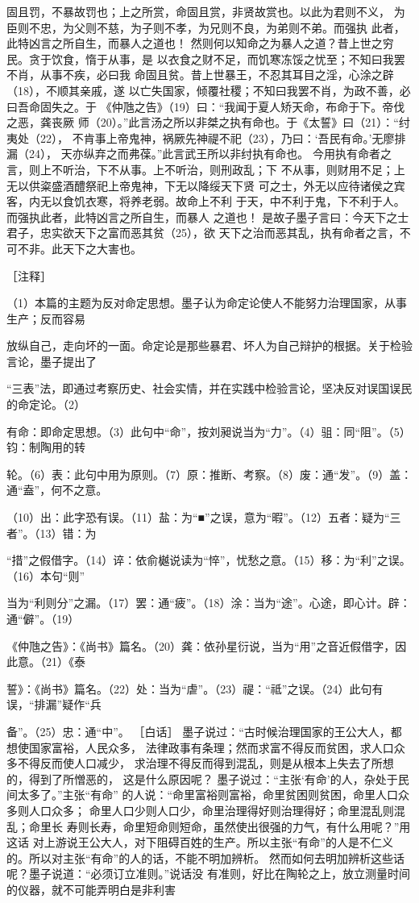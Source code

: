 \documentclass[12pt,UTF8]{ctexbook}
\begin{document}
固且罚，不暴故罚也；上之所赏，命固且赏，非贤故赏也。以此为君则不义， 
为臣则不忠，为父则不慈，为子则不孝，为兄则不良，为弟则不弟。而强执 
此者，此特凶言之所自生，而暴人之道也！ 
然则何以知命之为暴人之道？昔上世之穷民。贪于饮食，惰于从事，是 
以衣食之财不足，而饥寒冻馁之忧至；不知曰我罢不肖，从事不疾，必曰我 
命固且贫。昔上世暴王，不忍其耳目之淫，心涂之辟（18），不顺其亲戚，遂 
以亡失国家，倾覆社稷；不知曰我罢不肖，为政不善，必曰吾命固失之。于 
《仲虺之告》（19）曰：“我闻于夏人矫天命，布命于下。帝伐之恶，龚丧厥 
师（20）。”此言汤之所以非桀之执有命也。于《太誓》曰（21）：“纣夷处（22）， 
不肯事上帝鬼神，祸厥先神禔不祀（23），乃曰：‘吾民有命。’无廖排漏（24）， 
天亦纵弃之而弗葆。”此言武王所以非纣执有命也。 
今用执有命者之言，则上不听治，下不从事。上不听治，则刑政乱；下 
不从事，则财用不足；上无以供粢盛酒醴祭祀上帝鬼神，下无以降绥天下贤 
可之士，外无以应待诸侯之宾客，内无以食饥衣寒，将养老弱。故命上不利 
于天，中不利于鬼，下不利于人。而强执此者，此特凶言之所自生，而暴人 
之道也！ 
是故子墨子言曰：今天下之士君子，忠实欲天下之富而恶其贫（25），欲 
天下之治而恶其乱，执有命者之言，不可不非。此天下之大害也。 


［注释］ 

（1）本篇的主题为反对命定思想。墨子认为命定论使人不能努力治理国家，从事生产；反而容易 

放纵自己，走向坏的一面。命定论是那些暴君、坏人为自己辩护的根据。关于检验言论，墨子提出了 

“三表”法，即通过考察历史、社会实情，并在实践中检验言论，坚决反对误国误民的命定论。（2） 

有命：即命定思想。（3）此句中“命”，按刘昶说当为“力”。（4）驵：同“阻”。（5）钧：制陶用的转 

轮。（6）表：此句中用为原则。（7）原：推断、考察。（8）废：通“发”。（9）盖：通“盍”，何不之意。 

（10）出：此字恐有误。（11）盐：为“■”之误，意为“暇”。（12）五者：疑为“三者”。（13）错：为 

“措”之假借字。（14）谇：依俞樾说读为“悴”，忧愁之意。（15）移：为“利”之误。（16）本句“则” 

当为“利则分”之漏。（17）罢：通“疲”。（18）涂：当为“途”。心途，即心计。辟：通“僻”。（19） 

《仲虺之告》：《尚书》篇名。（20）龚：依孙星衍说，当为“用”之音近假借字，因此意。（21）《泰 

誓》：《尚书》篇名。（22）处：当为“虐”。（23）禔：“祗”之误。（24）此句有误，“排漏”疑作“兵 

备”。（25）忠：通“中”。 
［白话］ 
墨子说过：“古时候治理国家的王公大人，都想使国家富裕，人民众多， 
法律政事有条理；然而求富不得反而贫困，求人口众多不得反而使人口减少， 
求治理不得反而得到混乱，则是从根本上失去了所想的，得到了所憎恶的， 
这是什么原因呢？ 
墨子说过：“主张‘有命’的人，杂处于民间太多了。”主张“有命” 
的人说：“命里富裕则富裕，命里贫困则贫困，命里人口众多则人口众多； 
命里人口少则人口少，命里治理得好则治理得好；命里混乱则混乱；命里长 
寿则长寿，命里短命则短命，虽然使出很强的力气，有什么用呢？”用这话 
对上游说王公大人，对下阻碍百姓的生产。所以主张“有命”的人是不仁义 
的。所以对主张“有命”的人的话，不能不明加辨析。 
然而如何去明加辨析这些话呢？墨子说道：“必须订立准则。”说话没 
有准则，好比在陶轮之上，放立测量时间的仪器，就不可能弄明白是非利害 
\end{document}
